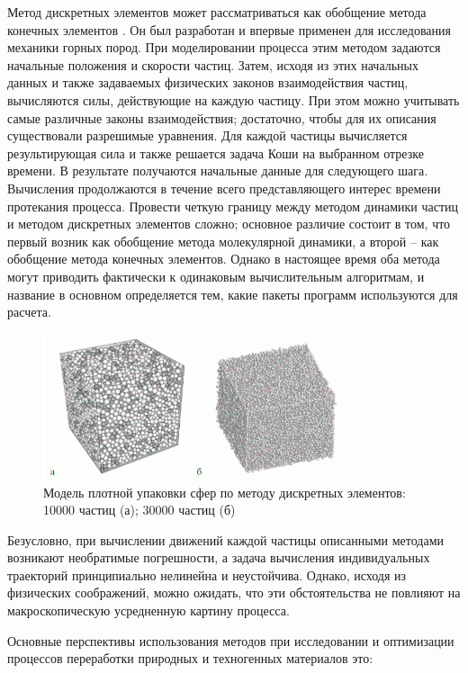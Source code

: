 \documentclass[utf8x, 14pt, oneside, a4paper]{article}
\begin{document}
Метод дискретных элементов может рассматриваться как обобщение метода конечных элементов \cite{mde_smth}.
Он был разработан и впервые применен для исследования механики горных пород. 
При моделировании процесса этим методом задаются начальные положения и скорости частиц. 
Затем, исходя из этих начальных данных и также задаваемых физических законов взаимодействия частиц, вычисляются силы, действующие на каждую частицу. 
При этом можно учитывать самые различные законы взаимодействия; достаточно, чтобы для их описания существовали разрешимые уравнения. 
Для каждой частицы вычисляется результирующая сила и также решается задача Коши на выбранном отрезке времени. 
В результате получаются начальные данные для следующего шага.
Вычисления продолжаются в течение всего представляющего интерес времени протекания процесса. 
Провести четкую границу между методом динамики частиц и методом дискретных элементов сложно; основное различие состоит в том, что первый возник как обобщение метода молекулярной динамики, а второй – как обобщение метода конечных элементов. 
Однако в настоящее время оба метода могут приводить фактически к одинаковым вычислительным алгоритмам, и название в основном определяется тем, какие пакеты программ используются для расчета.

\begin{figure}[H]
	\centering
	\includegraphics[width=0.8\textwidth]{primer}
	\caption{Модель плотной упаковки сфер по методу дискретных элементов: 10000 частиц (а); 30000 частиц (б)}
\end{figure} 

Безусловно, при вычислении движений каждой частицы описанными методами возникают необратимые погрешности, а задача вычисления индивидуальных траекторий принципиально нелинейна и неустойчива.
Однако, исходя из физических соображений, можно ожидать, что эти обстоятельства не повлияют на макроскопическую усредненную картину процесса. 

Основные перспективы использования методов при исследовании и оптимизации процессов переработки природных и техногенных материалов это:
\end{document}
